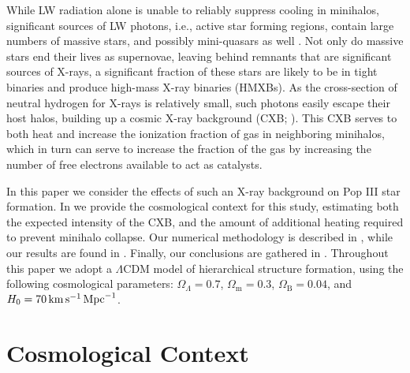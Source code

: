 \documentclass[../thesis.tex]{subfiles}
\begin{document}
While LW radiation alone is unable to reliably suppress \htwo cooling in minihalos, significant sources of LW photons, i.e., active star forming regions, contain large numbers of massive stars, and possibly mini-quasars as well \citep{KuhlenMadau2005, Jeonetal2012, Jeonetal2014a}.  Not only do massive stars end their lives as supernovae, leaving behind remnants that are significant sources of X-rays, a significant fraction of these stars are likely to be in tight binaries \citep[e.g.,][]{Clarketal2011b,Greifetal2012, Mirocha2014} and produce high-mass X-ray binaries (HMXBs).  As the cross-section of neutral hydrogen for X-rays is relatively small, such photons easily escape their host halos, building up a cosmic X-ray background (CXB; \citealt{Oh2001, HaimanAbelRees2000, VenkatesanGirouxShull2001, GloverBrand2003, Cen2003, KuhlenMadau2005, Jeonetal2012, Jeonetal2014a}). This CXB serves to both heat and increase the ionization fraction of gas in neighboring minihalos, which in turn can serve to increase the \htwo fraction of the gas by increasing the number of free electrons available to act as catalysts.

In this paper we consider the effects of such an X-ray background on Pop III star formation.  In  we provide the cosmological context for this study, estimating both the expected intensity of the CXB, and the amount of additional heating required to prevent minihalo collapse. Our numerical methodology is described in , while our results are found in .  Finally, our conclusions are gathered in .
Throughout this paper we adopt
a $\Lambda$CDM model of hierarchical structure formation, using the following
cosmological parameters: $\Omega_{\Lambda} = 0.7$, $\Omega_{\mathrm m} = 0.3$, $\Omega_{\mathrm B} = 0.04$, and $H_0 = 70 \,\mathrm{km}\,\mathrm{s}^{-1} \,\mathrm{Mpc}^{-1}$.

\section{Cosmological Context}
\label{xr_context}
\end{document}
